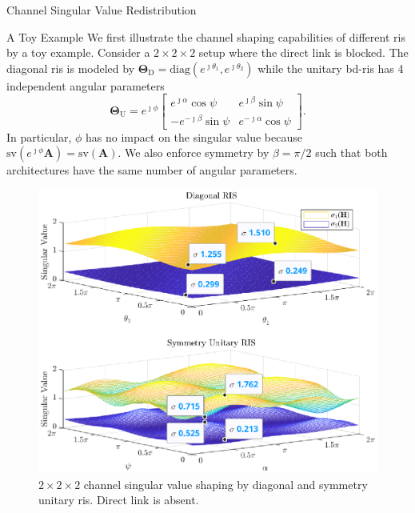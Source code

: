 \documentclass[journal]{IEEEtran}
\begin{document}
\begin{section}{Channel Singular Value Redistribution}
	\begin{subsection}{A Toy Example}
		We first illustrate the channel shaping capabilities of different \gls{ris} by a toy example.
		Consider a $2 \times 2 \times 2$ setup where the direct link is blocked.
		The diagonal \gls{ris} is modeled by $\mathbf{\Theta}_\mathrm{D} = \mathrm{diag}(e^{\jmath \theta_1}, e^{\jmath \theta_2})$ while the unitary \gls{bd}-\gls{ris} has 4 independent angular parameters
		\begin{equation}
			\mathbf{\Theta}_\mathrm{U} = e^{\jmath \phi} \begin{bmatrix}
				e^{\jmath \alpha} \cos \psi  & e^{\jmath \beta} \sin \psi   \\
				-e^{-\jmath \beta} \sin \psi & e^{-\jmath \alpha} \cos \psi
			\end{bmatrix}.
		\end{equation}
		In particular, $\phi$ has no impact on the singular value because $\mathrm{sv}(e^{\jmath \phi} \mathbf{A}) = \mathrm{sv}(\mathbf{A})$.
		We also enforce symmetry by $\beta = \pi / 2$ such that both architectures have the same number of angular parameters.
		\begin{figure}
			\centering
			\includegraphics[width=\columnwidth]{assets/simulation/pc_singular_toy.eps}
			\caption{$2 \times 2 \times 2$ channel singular value shaping by diagonal and symmetry unitary \gls{ris}. Direct link is absent.}

\end{figure}
\end{subsection}
\end{section}
\end{document}
